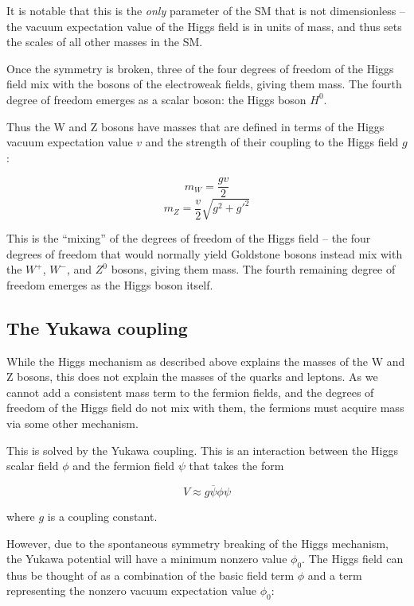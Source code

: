 It is notable that this is the \textit{only} parameter of the \acrlong{SM} that is not dimensionless -- the vacuum expectation value of the Higgs field is in units of mass, and thus sets the scales of all other masses in the \acrshort{SM}. 

Once the symmetry is broken, three of the four degrees of freedom of the Higgs field mix with the bosons of the electroweak fields, giving them mass. The fourth degree of freedom emerges as a scalar boson: the Higgs boson $H^0$.

Thus the W and Z bosons have masses that are defined in terms of the Higgs vacuum expectation value $v$ and the strength of their coupling to the Higgs field $g$:

\begin{equation}
	m_W = \frac{gv}{2}
\label{eq:w-mass}
\end{equation}
\begin{equation}
	m_Z = \frac{v}{2}\sqrt{g^2 + g'^2}
\label{eq:z-mass}
\end{equation}

This is the ``mixing'' of the degrees of freedom of the Higgs field -- the four degrees of freedom that would normally yield Goldstone bosons instead mix with the $W^+$, $W^-$, and $Z^0$ bosons, giving them mass. The fourth remaining degree of freedom emerges as the Higgs boson itself. %

\subsection{The Yukawa coupling}
While the Higgs mechanism as described above explains the masses of the W and Z bosons, this does not explain the masses of the quarks and leptons. As we cannot add a consistent mass term to the fermion fields, and the degrees of freedom of the Higgs field do not mix with them, the fermions must acquire mass via some other mechanism.

This is solved by the Yukawa coupling. This is an interaction between the Higgs scalar field $\phi$ and the fermion field $\psi$ that takes the form

\begin{equation}
	V \approx g \overline{\psi} \phi \psi
\label{eq:yukawa-interaction}
\end{equation}

where $g$ is a coupling constant.

However, due to the spontaneous symmetry breaking of the Higgs mechanism, the Yukawa potential will have a minimum nonzero value $\phi_0$. The Higgs field can thus be thought of as a combination of the basic field term $\phi$ and a term representing the nonzero vacuum expectation value $\phi_0$:

